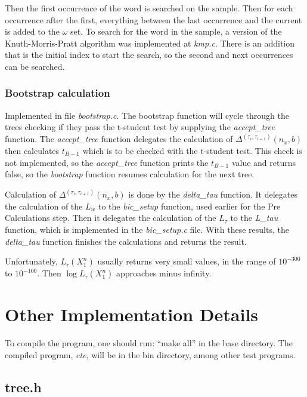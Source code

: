 \documentclass[brazil,11pt]{article}
\begin{document}
Then the first occurrence of the word is searched on the sample. Then for each occurrence after the first, everything between the last occurrence and the current is added to the $\omega$ set. To search for the word in the sample, a version of the Knuth-Morris-Pratt algorithm was implemented at \emph{kmp.c}. There is an addition that is the initial index to start the search, so the second and next occurrences can be searched.


\subsubsection{Bootstrap calculation}

Implemented in file \emph{bootstrap.c}. The bootstrap function will cycle through the trees checking if they pass the t-student test by supplying the \emph{accept\_tree} function. The \emph{accept\_tree} function delegates the calculation of $\Delta^{(\tau_i,\tau_{i+1})}(n_x,b)$ then calculates $t_{B-1}$ which is to be checked with the t-student test. This check is not implemented, so the \emph{accept\_tree} function prints the $t_{B-1}$ value and returns false, so the \emph{bootstrap} function resumes calculation for the next tree.

Calculation of $\Delta^{(\tau_i,\tau_{i+1})}(n_x,b)$ is done by the \emph{delta\_tau} function. It delegates the calculation of the $L_w$ to the \emph{bic\_setup} function, used earlier for the Pre Calculations step. Then it delegates the calculation of the $L_\tau$ to the \emph{L\_tau} function, which is implemented in the \emph{bic\_setup.c} file. With these results, the \emph{delta\_tau} function finishes the calculations and returns the result.

Unfortunately, $L_\tau(X^n_1)$ usually returns very small values, in the range of $10^{-300}$ to $10^{-100}$. Then $\log L_\tau(X^n_1)$ approaches minus infinity.


\section{Other Implementation Details}

To compile the program, one should run: ``make all'' in the base directory. The compiled program, \emph{cte}, will be in the bin directory, among other test programs.



\subsection{tree.h}
\end{document}
